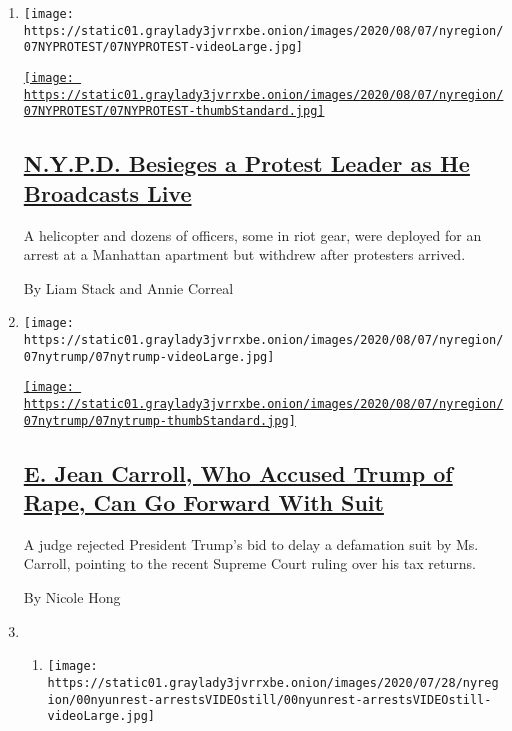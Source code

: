 \begin{enumerate}
\def\labelenumi{\arabic{enumi}.}
\item
  \texttt{[image: https://static01.graylady3jvrrxbe.onion/images/2020/08/07/nyregion/07NYPROTEST/07NYPROTEST-videoLarge.jpg]}

  \href{/2020/08/07/nyregion/nypd-derrick-ingram-protester.html}{\texttt{[image: https://static01.graylady3jvrrxbe.onion/images/2020/08/07/nyregion/07NYPROTEST/07NYPROTEST-thumbStandard.jpg]}}

  \hypertarget{nypd-besieges-a-protest-leader-as-he-broadcasts-live}{%
  \subsection{\texorpdfstring{\href{/2020/08/07/nyregion/nypd-derrick-ingram-protester.html}{N.Y.P.D.
  Besieges a Protest Leader as He Broadcasts
  Live}}{N.Y.P.D. Besieges a Protest Leader as He Broadcasts Live}}\label{nypd-besieges-a-protest-leader-as-he-broadcasts-live}}

  A helicopter and dozens of officers, some in riot gear, were deployed
  for an arrest at a Manhattan apartment but withdrew after protesters
  arrived.

  By Liam Stack and Annie Correal
\item
  \texttt{[image: https://static01.graylady3jvrrxbe.onion/images/2020/08/07/nyregion/07nytrump/07nytrump-videoLarge.jpg]}

  \href{/2020/08/07/nyregion/jean-caroll-donald-trump-lawsuit-rape.html}{\texttt{[image: https://static01.graylady3jvrrxbe.onion/images/2020/08/07/nyregion/07nytrump/07nytrump-thumbStandard.jpg]}}

  \hypertarget{e-jean-carroll-who-accused-trump-of-rape-can-go-forward-with-suit}{%
  \subsection{\texorpdfstring{\href{/2020/08/07/nyregion/jean-caroll-donald-trump-lawsuit-rape.html}{E.
  Jean Carroll, Who Accused Trump of Rape, Can Go Forward With
  Suit}}{E. Jean Carroll, Who Accused Trump of Rape, Can Go Forward With Suit}}\label{e-jean-carroll-who-accused-trump-of-rape-can-go-forward-with-suit}}

  A judge rejected President Trump's bid to delay a defamation suit by
  Ms. Carroll, pointing to the recent Supreme Court ruling over his tax
  returns.

  By Nicole Hong
\item
  \begin{enumerate}
  \def\labelenumii{\arabic{enumii}.}
  \item
    \texttt{[image: https://static01.graylady3jvrrxbe.onion/images/2020/07/28/nyregion/00nyunrest-arrestsVIDEOstill/00nyunrest-arrestsVIDEOstill-videoLarge.jpg]}


\end{enumerate}
\end{enumerate}
